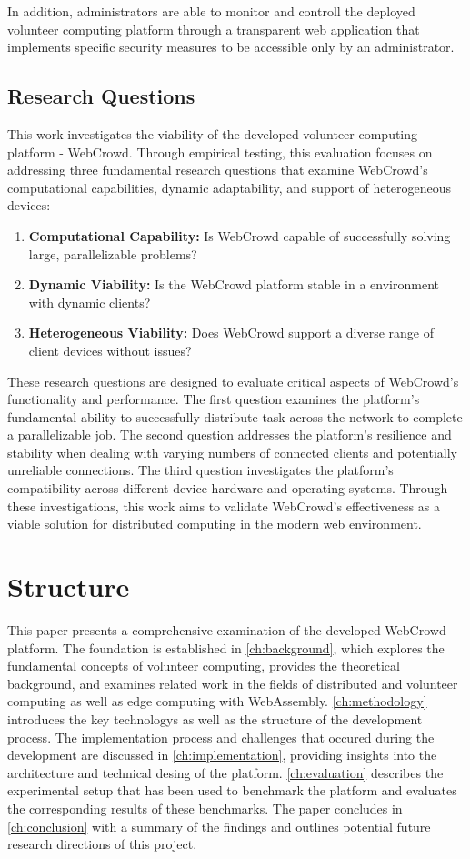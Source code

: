 In addition, administrators are able to monitor and controll the deployed volunteer computing platform through a transparent web application that implements specific security measures to be accessible only by an administrator.

\subsection{Research Questions}
\label{subsec:into:objectives:questions}
This work investigates the viability of the developed volunteer computing platform - WebCrowd. Through empirical testing, this evaluation focuses on addressing three fundamental research questions that examine WebCrowd's computational capabilities, dynamic adaptability, and support of heterogeneous devices:
\begin{enumerate}
    \item \textbf{Computational Capability:} Is WebCrowd capable of successfully solving large, parallelizable problems?
    \item \textbf{Dynamic Viability:} Is the WebCrowd platform stable in a environment with dynamic clients?
    \item \textbf{Heterogeneous Viability:} Does WebCrowd support a diverse range of client devices without issues?
\end{enumerate}
These research questions are designed to evaluate critical aspects of WebCrowd's functionality and performance. The first question examines the platform's fundamental ability to successfully distribute task across the network to complete a parallelizable job. The second question addresses the platform's resilience and stability when dealing with varying numbers of connected clients and potentially unreliable connections. The third question investigates the platform's compatibility across different device hardware and operating systems. Through these investigations, this work aims to validate WebCrowd's effectiveness as a viable solution for distributed computing in the modern web environment.

\section{Structure}
\label{sec:intro:structure}
This paper presents a comprehensive examination of the developed WebCrowd platform. The foundation is established in \autoref{ch:background}, which explores the fundamental concepts of volunteer computing, provides the theoretical background, and examines related work in the fields of distributed and volunteer computing as well as edge computing with WebAssembly. \autoref{ch:methodology} introduces the key technologys as well as the structure of the development process. The implementation process and challenges that occured during the development are discussed in \autoref{ch:implementation}, providing insights into the architecture and technical desing of the platform. \autoref{ch:evaluation} describes the experimental setup that has been used to benchmark the platform and evaluates the corresponding results of these benchmarks. The paper concludes in \autoref{ch:conclusion} with a summary of the findings and outlines potential future research directions of this project.
